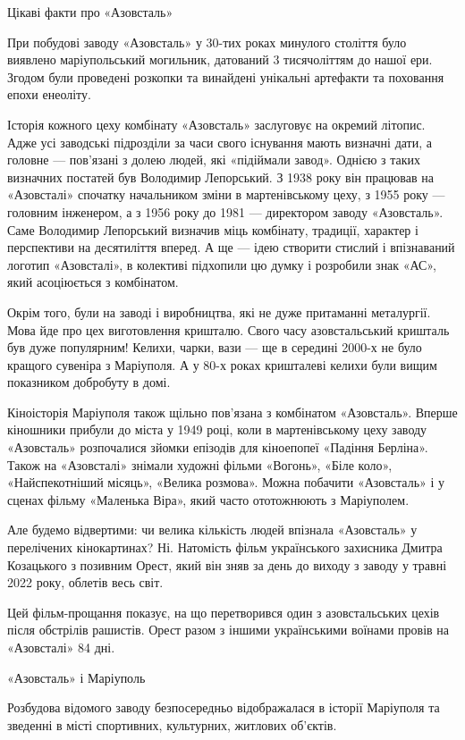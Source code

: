 Цікаві факти про «Азовсталь»

При побудові заводу «Азовсталь» у 30-тих роках минулого століття було виявлено
маріупольський могильник, датований 3 тисячоліттям до нашої ери. Згодом були
проведені розкопки та винайдені унікальні артефакти та поховання епохи
енеоліту.

Історія кожного цеху комбінату «Азовсталь» заслуговує на окремий літопис. Адже
усі заводські підрозділи за часи свого існування мають визначні дати, а головне
— пов'язані з долею людей, які «підіймали завод». Однією з таких визначних
постатей був Володимир Лепорський. З 1938 року він працював на «Азовсталі»
спочатку начальником зміни в мартенівському цеху, з 1955 року — головним
інженером, а з 1956 року до 1981 — директором заводу «Азовсталь». Саме
Володимир Лепорський визначив міць комбінату, традиції, характер і перспективи
на десятиліття вперед. А ще — ідею створити стислий і впізнаваний логотип
«Азовсталі», в колективі підхопили цю думку і розробили знак «АС», який
асоціюється з комбінатом.

Окрім того, були на заводі і виробництва, які не дуже притаманні металургії.
Мова йде про цех виготовлення кришталю. Свого часу азовстальський кришталь був
дуже популярним! Келихи, чарки, вази — ще в середині 2000-х не було кращого
сувеніра з Маріуполя. А у 80-х роках кришталеві келихи були вищим показником
добробуту в домі. 

Кіноісторія Маріуполя також щільно пов'язана з комбінатом «Азовсталь». Вперше
кіношники прибули до міста у 1949 році, коли в мартенівському цеху заводу
«Азовсталь» розпочалися зйомки епізодів для кіноепопеї «Падіння Берліна». Також
на «Азовсталі» знімали художні фільми «Вогонь», «Біле коло», «Найспекотніший
місяць», «Велика розмова». Можна побачити «Азовсталь» і у сценах фільму
«Маленька Віра», який часто ототожнюють з Маріуполем.

Але будемо відвертими: чи велика кількість людей впізнала «Азовсталь» у
перелічених кінокартинах? Ні. Натомість фільм українського захисника Дмитра
Козацького з позивним Орест, який він зняв за день до виходу з заводу у травні
2022 року, облетів весь світ.

Цей фільм-прощання показує, на що перетворився один з азовстальських цехів
після обстрілів рашистів. Орест разом з іншими українськими воїнами провів на
«Азовсталі» 84 дні.

«Азовсталь» і Маріуполь

Розбудова відомого заводу безпосередньо відображалася в історії Маріуполя та
зведенні в місті спортивних, культурних, житлових об'єктів.

